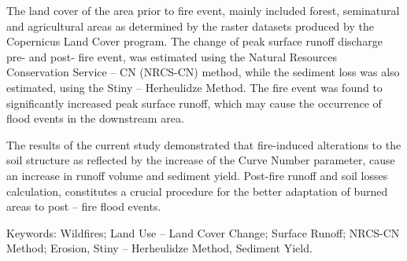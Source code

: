 The land cover of the area prior to fire event, mainly included forest, seminatural and agricultural areas as determined by the raster datasets produced by the Copernicus Land Cover program. The change of peak surface runoff discharge pre- and post- fire event, was estimated using the Natural Resources Conservation Service – CN (NRCS-CN) method, while the sediment loss was also estimated, using the Stiny – Herheulidze Method. The fire event was found to significantly increased peak surface runoff, which may cause the occurrence of flood events in the downstream area. 

The results of the current study demonstrated that fire-induced alterations to the soil structure as reflected by the increase of the Curve Number parameter, cause an increase in runoff volume and sediment yield. Post-fire runoff and soil losses calculation, constitutes a crucial procedure for the better adaptation of burned areas to post – fire flood events. 

Keywords: Wildfires; Land Use – Land Cover Change; Surface Runoff; NRCS-CN Method; Erosion, Stiny – Herheulidze Method, Sediment Yield.





\newpage{}
{}
\begin{flushleft}






\end{flushleft}

